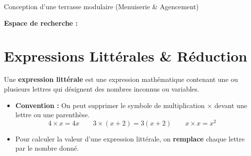\begin{activite}{Conception d'une terrasse modulaire (Menuiserie \& Agencement)}
\begin{center}
\end{center}

\vspace{1mm}
\noindent\textbf{Espace de recherche :}
\lignesreponse[4]
\end{activite}

\section{Expressions Littérales \& Réduction}

\begin{cadredef}
Une \textbf{expression littérale} est une expression mathématique contenant une ou plusieurs lettres qui désignent des nombres inconnus ou variables.
\begin{itemize}
    \item \textbf{Convention :} On peut supprimer le symbole de multiplication $\times$ devant une lettre ou une parenthèse.
    \[ 4 \times x = 4x \qquad 3 \times (x + 2) = 3(x+2) \qquad x \times x = x^2 \]
    \item Pour calculer la valeur d'une expression littérale, on \textbf{remplace} chaque lettre par le nombre donné.
\end{itemize}
\end{cadredef}

